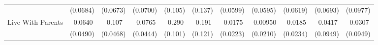 {\begin{tabular}{l*{10}{c}}
            &    (0.0684)         &    (0.0673)         &    (0.0700)         &     (0.105)         &     (0.137)         &    (0.0599)         &    (0.0595)         &    (0.0619)         &    (0.0693)         &    (0.0977)         \\
\addlinespace
Live With Parents&     -0.0640         &      -0.107\sym{*}  &     -0.0765         &      -0.290\sym{**} &      -0.191         &     -0.0175         &    -0.00950         &     -0.0185         &     -0.0417         &     -0.0307         \\
            &    (0.0490)         &    (0.0468)         &    (0.0444)         &     (0.101)         &     (0.121)         &    (0.0223)         &    (0.0210)         &    (0.0234)         &    (0.0949)         &    (0.0949)         \\
\bottomrule
\end{tabular}
}
